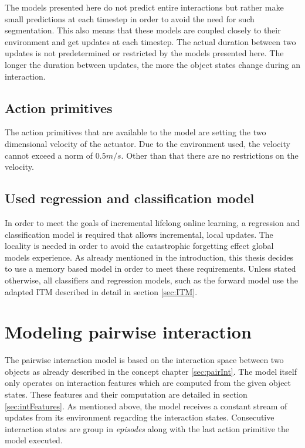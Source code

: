 The models presented here do not predict entire interactions but rather make small predictions at each timestep in order to avoid the need for such segmentation. This also means that these models are coupled closely to their environment and get updates at each timestep. The actual duration between two updates is not predetermined or restricted by the models presented here. The longer the duration between updates, the more the object states change during an interaction. 

\subsection{Action primitives}
The action primitives that are available to the model are setting the  two dimensional velocity of the actuator. Due to the environment used, the velocity cannot exceed a norm of $0.5m/s$. Other than that there are no restrictions on the velocity. 


\subsection{Used regression and classification model}

In order to meet the goals of incremental lifelong online learning, a regression and classification model is required that allows incremental, local updates. The locality is needed in order to avoid the catastrophic forgetting effect global models experience. As already mentioned in the introduction, this thesis decides to use a memory based model in order to meet these requirements. Unless stated otherwise, all classifiers and regression models, such as the forward model use the adapted ITM described in detail in section \ref{sec:ITM}.


\section{Modeling pairwise interaction \label{sec:pairRealization}}

The pairwise interaction model is based on the interaction space between two objects as already described in the concept chapter \ref{sec:pairInt}. The model itself only operates on interaction features which are computed from the given object states. These features and their computation are detailed in section \ref{sec:intFeatures}. As mentioned above, the model receives a constant stream of updates from its environment regarding the interaction states. Consecutive interaction states are group in \textit{episodes} along with the last action primitive the model executed. 


